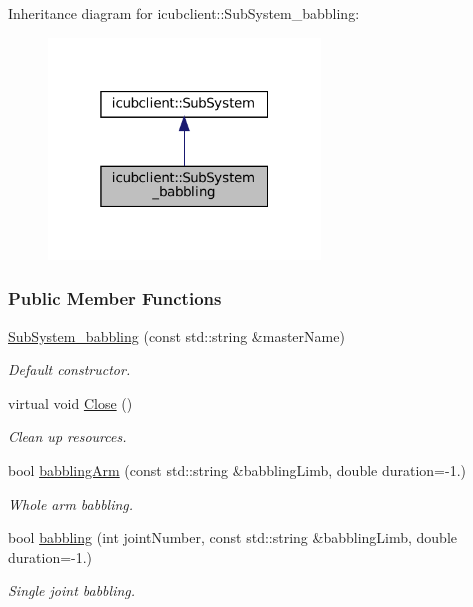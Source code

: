 Inheritance diagram for icubclient\+:\+:Sub\+System\+\_\+babbling\+:
\nopagebreak
\begin{figure}[H]
\begin{center}
\leavevmode
\includegraphics[width=205pt]{classicubclient_1_1SubSystem__babbling__inherit__graph}
\end{center}
\end{figure}
\subsubsection*{Public Member Functions}
\begin{DoxyCompactItemize}
\item 
\hyperlink{group__icubclient__subsystems_a7a48e0c4846d9f35586d0f5b3cd95ac7}{Sub\+System\+\_\+babbling} (const std\+::string \&master\+Name)
\begin{DoxyCompactList}\small\item\em Default constructor. \end{DoxyCompactList}\item 
virtual void \hyperlink{group__icubclient__subsystems_a9865dd2f02610e3ea80923b7194981ae}{Close} ()
\begin{DoxyCompactList}\small\item\em Clean up resources. \end{DoxyCompactList}\item 
bool \hyperlink{group__icubclient__subsystems_ae8183d3b5dd075eaaa16b5a0d3b201e4}{babbling\+Arm} (const std\+::string \&babbling\+Limb, double duration=-\/1.)
\begin{DoxyCompactList}\small\item\em Whole arm babbling. \end{DoxyCompactList}\item 
bool \hyperlink{group__icubclient__subsystems_a9baa0d296d355f5e2c83ec972b17cdad}{babbling} (int joint\+Number, const std\+::string \&babbling\+Limb, double duration=-\/1.)
\begin{DoxyCompactList}\small\item\em Single joint babbling. \end{DoxyCompactList}\end{DoxyCompactItemize}
